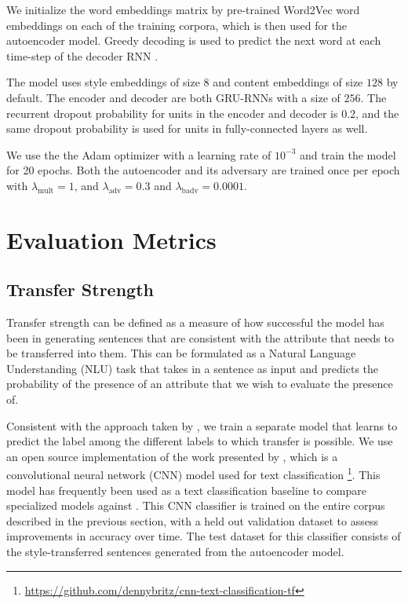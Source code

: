 We initialize the word embeddings matrix by pre-trained Word2Vec word embeddings \citep{mikolov2013efficient,mikolov2013distributed,mikolov2013linguistic} on each of the training corpora, which is then used for the autoencoder model. Greedy decoding  is used to predict the next word at each time-step of the decoder RNN \citep{germann2003greedy}.

The model uses style embeddings of size $8$ and content embeddings of size $128$ by default. The encoder and decoder are both GRU-RNNs with a size of $256$. The recurrent dropout probability for units in the encoder and decoder is $0.2$, and the same dropout probability is used for units in fully-connected layers as well.

We use the the Adam optimizer \citep{kingma2014adam} with a learning rate of $10^{-3}$ and train the model for 20 epochs. Both the autoencoder and its adversary are trained once per epoch with $\lambda_\text{mult} = 1$, and $\lambda_\text{adv} = 0.3$ and $\lambda_\text{badv} = 0.0001$.


\section{Evaluation Metrics} \label{sec:evaluation-metrics}

\subsection{Transfer Strength}

Transfer strength can be defined as a measure of how successful the model has been in generating sentences that are consistent with the attribute that needs to be transferred into them. This can be formulated as a Natural Language Understanding (NLU) task that takes in a sentence as input and predicts the probability of the presence of an attribute that we wish to evaluate the presence of.

Consistent with the approach taken by \cite{hu2017toward,shen2017style,fu2017style}, we train a separate model that learns to predict the label among the different labels to which transfer is possible. We use an open source implementation of the work presented by \cite{kim2014convolutional}, which is a convolutional neural network (CNN) model used for text classification \footnote{\url{https://github.com/dennybritz/cnn-text-classification-tf}}. This model has frequently been used as a text classification baseline to compare specialized models against \citep{tai2015improved,kiros2015skip,zhang2015character}. This CNN classifier is trained on the entire corpus described in the previous section, with a held out validation dataset to assess improvements in accuracy over time. The test dataset for this classifier consists of the style-transferred sentences generated from the autoencoder model.

